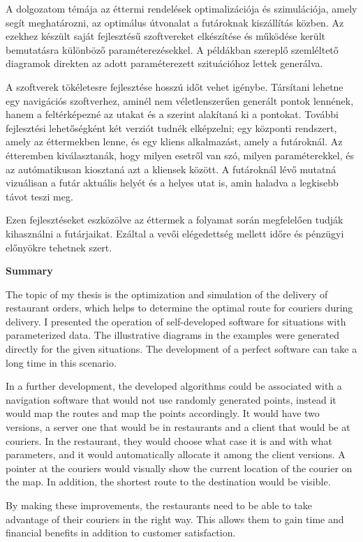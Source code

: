 
A dolgozatom témája az éttermi rendelések optimalizációja és szimulációja, amely segít meghatározni, az optimálus útvonalat a futároknak kiszállítás közben. Az ezekhez készült saját fejlesztésű szoftvereket elkészítése és működése került bemutatásra különböző paraméterezésekkel. A példákban szereplő szemléltető diagramok direkten az adott paraméterezett szituációhoz lettek generálva.

A szoftverek tökéletesre fejlesztése hosszú időt vehet igénybe. Társítani lehetne egy navigációs szoftverhez, aminél nem véletlenszerűen generált pontok lennének, hanem a feltérképezné az utakat és a szerint alakítaná ki a pontokat. További fejlesztési lehetőségként két verziót tudnék elképzelni; egy központi rendszert, amely az éttermekben lenne, és egy kliens alkalmazást, amely a futároknál. Az étteremben kiválasztanák, hogy milyen esetről van szó, milyen paraméterekkel, és az autómatikusan kiosztaná azt a kliensek között. A futároknál lévő mutatná vizuálisan a futár aktuális helyét és a helyes utat is, amin haladva a legkisebb távot teszi meg.

Ezen fejlesztéseket eszközölve az éttermek a folyamat során megfelelően tudják kihasználni a futárjaikat. Ezáltal a vevői elégedettség mellett időre és pénzügyi előnyökre tehetnek szert.

\newpage

\noindent \textbf{\Large Summary}

\bigskip

The topic of my thesis is the optimization and simulation of the delivery of restaurant orders, which helps to determine the optimal route for couriers during delivery. I presented the operation of self-developed software for situations with parameterized data. The illustrative diagrams in the examples were generated directly for the given situations. The development of a perfect software can take a long time in this scenario.

In a further development, the developed algorithms could be associated with a navigation software that would not use randomly generated points, instead it would map the routes and map the points accordingly. It would have two versions, a server one that would be in restaurants and a client that would be at couriers. In the restaurant, they would choose what case it is and with what parameters, and it would automatically allocate it among the client versions. A pointer at the couriers would visually show the current location of the courier on the map. In addition, the shortest route to the destination would be visible.

By making these improvements, the restaurants need to be able to take advantage of their couriers in the right way. This allows them to gain time and financial benefits in addition to customer satisfaction.
